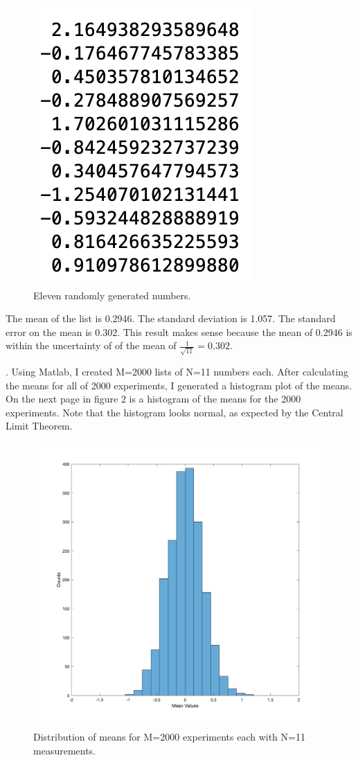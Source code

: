 \documentclass{article}
\begin{document}
\begin{figure}[H]
  \centering
  \includegraphics[width=0.4\linewidth]{lateximages/eleven.png}
  \caption{Eleven randomly generated numbers.}
  \label{fig:boat1}
  \end{figure}
  
  \noindent The mean of the list is 0.2946. The standard deviation is 1.057. The standard error on the mean is 0.302. This result makes sense because the mean of 0.2946 is within the uncertainty of of the mean of $\frac{1}{\sqrt{11}}=0.302$. \newline

 . Using Matlab, I created M=2000 lists of N=11 numbers each. After calculating the means for all of 2000 experiments, I generated a histogram plot of the means. On the next page in figure 2 is a histogram of the means for the 2000 experiments. Note that the histogram looks normal, as expected by the Central Limit Theorem.
  
  \begin{figure}[H]
  \centering
  \includegraphics[width=0.8\linewidth]{lateximages/Prob3_3.png}
  \caption{Distribution of means for M=2000 experiments each with N=11 measurements.}
  \label{fig:boat1}
  \end{figure}
  
\end{document}
